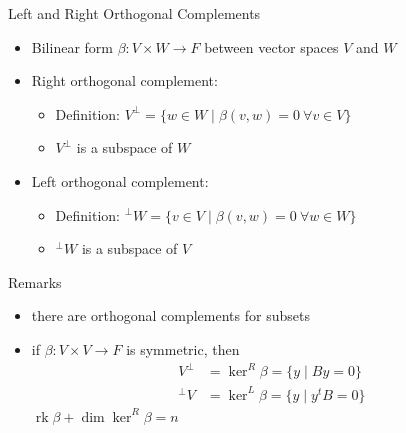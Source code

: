 \documentclass[fullscreen=true, bookmarks=true, hyperref={pdfencoding=unicode}]{beamer}
\begin{document}
\begin{frame}{Left and Right Orthogonal Complements}
  \begin{itemize}
    \pause \item Bilinear form $\beta: V \times W \rightarrow F$ 
    between vector spaces $V$ and $W$
    \pause \item Right orthogonal complement:
      \begin{itemize}
        \item Definition: $V^\perp = \{w \in W \mid \beta(v, w) = 0 \ \forall v \in V\}$
        \item $V^\perp$ is a subspace of $W$
      \end{itemize}
      \pause \item Left orthogonal complement:
      \begin{itemize}
        \item Definition: $^\perp W = \{v \in V \mid \beta(v, w) = 0 \ \forall w \in W\}$
        \item $^\perp W$ is a subspace of $V$
      \end{itemize}
  \end{itemize}

  \pause
  \begin{block}{Remarks}
    \begin{itemize}
      \item there are orthogonal complements for subsets
      \item if $\beta: V \times V \rightarrow F$ is symmetric, then 
      \begin{align*}
        V^\perp &= \operatorname{ker}^R \beta =  \{y \mid By = 0 \} \\
        ^\perp V &= \operatorname{ker}^L \beta =  \{y \mid y^tB = 0 \}
      \end{align*}
      $\operatorname{rk} \beta + \dim \operatorname{ker}^R \beta = n$
    \end{itemize}
  \end{block}
\end{frame}
\end{document}
